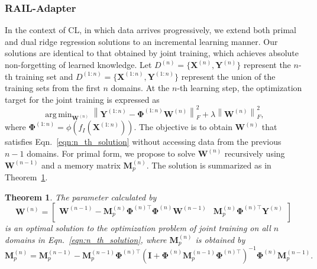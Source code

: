 \documentclass{article}
\DeclareMathOperator*{\argmin}{arg\,min}
\newtheorem{theorem}{Theorem}
\begin{document}
\subsubsection{RAIL-Adapter}
In the context of CL, in which data arrives progressively, we extend both primal and dual ridge regression solutions to an incremental learning manner. Our solutions are identical to that obtained by joint training, which achieves absolute non-forgetting of learned knowledge.
Let $D^{(n)}=\{\mathbf{X}^{(n)}, \mathbf{Y}^{(n)}\}$ represent the $n$-th training set and $D^{(1:n)}=\{\mathbf{X}^{(1:n)}, \mathbf{Y}^{(1:n)}\}$ represent the union of the training sets from the first $n$ domains. At the $n$-th learning step, the optimization target for the joint training is expressed as
\begin{equation}
\label{eqn:n_th_solution}
\argmin_{\mathbf{W}^{\left(n\right)}} \left\| 
\mathbf{Y}^{(1:n)} - \mathbf{\Phi}^{\left(1:n\right)}\mathbf{W}^{\left(n\right)}
\right\|_F^2 + \lambda \left\| \mathbf{W}^{\left(n\right)} \right\|_F^2,
\end{equation}
where $\mathbf{\Phi}^{\left(1:n\right)}=\phi\left(f_I\left(\mathbf{X}^{\left(1:n\right)}\right)\right)$. The objective is to obtain $\mathbf{W}^{\left(n\right)}$ that satisfies Eqn.~\ref{eqn:n_th_solution} without accessing data from the previous $n-1$ domains. For primal form, we propose to solve $\mathbf{W}^{\left(n\right)}$ recursively using $\mathbf{W}^{\left(n-1\right)}$ and a memory matrix $\mathbf{M}_p^{\left(n\right)}$. The solution is summarized as in Theorem~\ref{primal_theorem}.
\begin{theorem}
The parameter calculated by
\label{primal_theorem}
    \begin{equation}
    \label{w_update}
    \mathbf{W}^{\left(n\right)} = 
\begin{bmatrix}
    {\mathbf{W}^{\left(n-1\right)}- \mathbf{M}_p^{\left(n\right)} \mathbf{\Phi}^{\left(n\right)\top}\mathbf{\Phi}^{\left(n\right)}\mathbf{W}^{\left(n-1\right)}} & \mathbf{M}_p^{\left(n\right)}\mathbf{\Phi}^{\left(n\right)\top}\mathbf{Y}^{\left(n\right)} \\
\end{bmatrix}
\end{equation}
is an optimal solution to the optimization problem of joint training on all $n$ domains in Eqn.~\ref{eqn:n_th_solution}, where $\mathbf{M}_p^{\left(n\right)}$ is obtained by
    \begin{equation}
\label{M_primal}
    \mathbf{M}_p^{\left(n\right)} = \mathbf{M}_p^{\left(n-1\right)} - \mathbf{M}_p^{\left(n-1\right)} \mathbf{\Phi}^{\left(n\right)\top} \left(\mathbf{I} + \mathbf{\Phi}^{\left(n\right)} \mathbf{M}_p^{\left(n-1\right)} \mathbf{\Phi}^{\left(n\right)\top} \right)^{-1} \mathbf{\Phi}^{\left(n\right)} \mathbf{M}_p^{\left(n-1\right)}.
    \end{equation}
\end{theorem}
\end{document}
